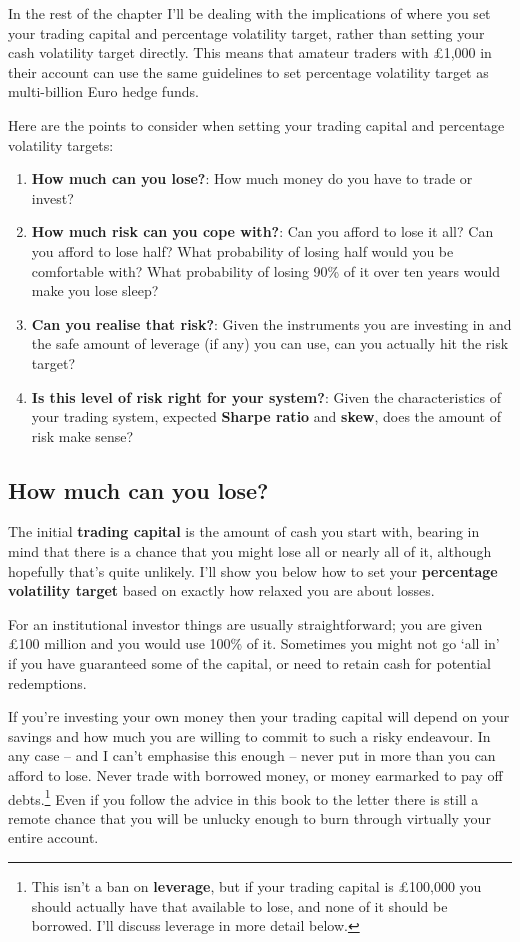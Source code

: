 In the rest of the chapter I'll be dealing with the implications of where you set your trading capital and percentage volatility target, rather than setting your cash volatility target directly. This means that amateur traders with £1,000 in their account can use the same guidelines to set percentage volatility target as multi-billion Euro hedge funds.

Here are the points to consider when setting your trading capital and percentage volatility targets:

\begin{enumerate}
\item \textbf{How much can you lose?}: How much money do you have to trade or invest?
\item \textbf{How much risk can you cope with?}: Can you afford to lose it all? Can you afford to lose half? What probability of losing half would you be comfortable with? What probability of losing 90\% of it over ten years would make you lose sleep?
\item \textbf{Can you realise that risk?}: Given the instruments you are investing in and the safe amount of leverage (if any) you can use, can you actually hit the risk target?
\item \textbf{Is this level of risk right for your system?}: Given the characteristics of your trading system, expected \textbf{Sharpe ratio} and \textbf{skew}, does the amount of risk make sense? \end{enumerate}

\subsection*{How much can you lose?}

The initial \textbf{trading capital} is the amount of cash you start with, bearing in mind that there is a chance that you might lose all or nearly all of it, although hopefully that's quite unlikely. I'll show you below how to set your \textbf{percentage volatility target} based on exactly how relaxed you are about losses.

For an institutional investor things are usually straightforward; you are given £100 million and you would use 100\% of it. Sometimes you might not go ‘all in' if you have guaranteed some of the capital, or need to retain cash for potential redemptions.

If you're investing your own money then your trading capital will depend on your savings and how much you are willing to commit to such a risky endeavour. In any case -- and I can't emphasise this enough -- never put in more than you can afford to lose. Never trade with borrowed money, or money earmarked to pay off debts.\footnote{This isn't a ban on \textbf{leverage}, but if your trading capital is £100,000 you should actually have that available to lose, and none of it should be borrowed. I'll discuss leverage in more detail below.} Even if you follow the advice in this book to the letter there is still a remote chance that you will be unlucky enough to burn through virtually your entire account.

